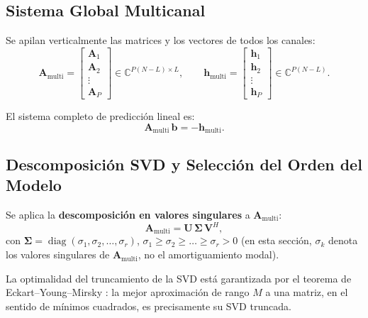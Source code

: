 \subsection{Sistema Global Multicanal}

Se apilan verticalmente las matrices y los vectores de todos los canales:
\begin{equation}
\mathbf{A}_{\text{multi}} =
\begin{bmatrix} \mathbf{A}_1 \\ \mathbf{A}_2 \\ \vdots \\ \mathbf{A}_P \end{bmatrix}
\in \mathbb{C}^{P(N-L)\times L},
\qquad
\mathbf{h}_{\text{multi}} =
\begin{bmatrix} \mathbf{h}_1 \\ \mathbf{h}_2 \\ \vdots \\ \mathbf{h}_P \end{bmatrix}
\in \mathbb{C}^{P(N-L)}.
\label{eq:multi_system}
\end{equation}

El sistema completo de predicción lineal es:
\begin{equation}
\boxed{\mathbf{A}_{\text{multi}}\,\mathbf{b} = -\mathbf{h}_{\text{multi}}}.
\label{eq:multi_equation}
\end{equation}

\subsection{Descomposición SVD y Selección del Orden del Modelo}

Se aplica la \textbf{descomposición en valores singulares} a $\mathbf{A}_{\text{multi}}$:
\begin{equation}
\mathbf{A}_{\text{multi}} = \mathbf{U}\,\boldsymbol{\Sigma}\,\mathbf{V}^H,
\label{eq:svd}
\end{equation}
con $\boldsymbol{\Sigma} = \operatorname{diag}(\sigma_1,\sigma_2,\dots,\sigma_r)$, $\sigma_1 \ge \sigma_2 \ge \dots \ge \sigma_r > 0$
(en esta sección, $\sigma_k$ denota los valores singulares de
$\mathbf{A}_{\text{multi}}$, no el amortiguamiento modal).

La optimalidad del truncamiento de la SVD está garantizada por el teorema
de Eckart--Young--Mirsky \cite{brunton2022}: la mejor aproximación de
rango $M$ a una matriz, en el sentido de mínimos cuadrados, es
precisamente su SVD truncada.

